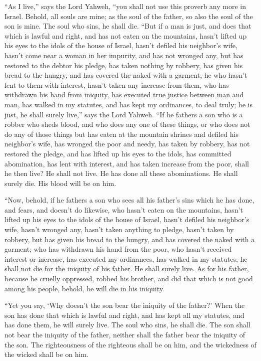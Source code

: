  ``As I live,'' says the Lord Yahweh, ``you shall not use
this proverb any more in Israel.  Behold, all souls are
mine; as the soul of the father, so also the soul of the son is mine.
The soul who sins, he shall die.  ``But if a man is just,
and does that which is lawful and right,  and has not eaten
on the mountains, hasn't lifted up his eyes to the idols of the house of
Israel, hasn't defiled his neighbor's wife, hasn't come near a woman in
her impurity,  and has not wronged any, but has restored to
the debtor his pledge, has taken nothing by robbery, has given his bread
to the hungry, and has covered the naked with a garment;  he
who hasn't lent to them with interest, hasn't taken any increase from
them, who has withdrawn his hand from iniquity, has executed true
justice between man and man,  has walked in my statutes, and
has kept my ordinances, to deal truly; he is just, he shall surely
live,'' says the Lord Yahweh.  ``If he fathers a son who is
a robber who sheds blood, and who does any one of these things,
 or who does not do any of those things but has eaten at
the mountain shrines and defiled his neighbor's wife,  has
wronged the poor and needy, has taken by robbery, has not restored the
pledge, and has lifted up his eyes to the idols, has committed
abomination,  has lent with interest, and has taken
increase from the poor, shall he then live? He shall not live. He has
done all these abominations. He shall surely die. His blood will be on
him.

 ``Now, behold, if he fathers a son who sees all his
father's sins which he has done, and fears, and doesn't do likewise,
 who hasn't eaten on the mountains, hasn't lifted up his
eyes to the idols of the house of Israel, hasn't defiled his neighbor's
wife,  hasn't wronged any, hasn't taken anything to pledge,
hasn't taken by robbery, but has given his bread to the hungry, and has
covered the naked with a garment;  who has withdrawn his
hand from the poor, who hasn't received interest or increase, has
executed my ordinances, has walked in my statutes; he shall not die for
the iniquity of his father. He shall surely live.  As for
his father, because he cruelly oppressed, robbed his brother, and did
that which is not good among his people, behold, he will die in his
iniquity.

 ``Yet you say, `Why doesn't the son bear the iniquity of
the father?' When the son has done that which is lawful and right, and
has kept all my statutes, and has done them, he will surely live.
 The soul who sins, he shall die. The son shall not bear
the iniquity of the father, neither shall the father bear the iniquity
of the son. The righteousness of the righteous shall be on him, and the
wickedness of the wicked shall be on him.

